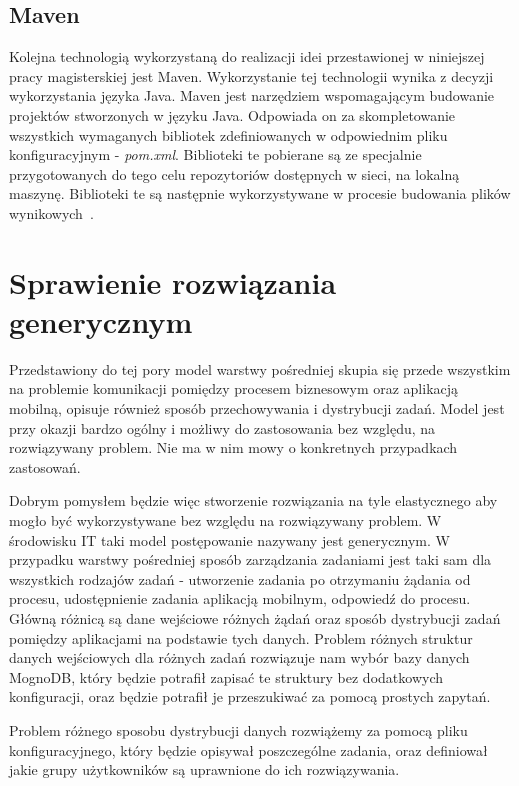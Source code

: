 \subsection{Maven}
Kolejna technologią wykorzystaną do realizacji idei przestawionej w niniejszej pracy magisterskiej jest Maven. Wykorzystanie tej technologii wynika z decyzji wykorzystania języka Java. Maven jest narzędziem wspomagającym budowanie projektów stworzonych w języku Java. Odpowiada on za skompletowanie wszystkich wymaganych bibliotek zdefiniowanych w odpowiednim pliku konfiguracyjnym - \textit{pom.xml}. Biblioteki te pobierane są ze specjalnie przygotowanych do tego celu repozytoriów dostępnych w sieci, na lokalną maszynę. Biblioteki te są następnie wykorzystywane w procesie budowania plików wynikowych~\cite{maven}.  


\section{Sprawienie rozwiązania generycznym}
\label{sec:generic}

Przedstawiony do tej pory model warstwy pośredniej skupia się przede wszystkim na problemie komunikacji pomiędzy procesem biznesowym oraz aplikacją mobilną, opisuje również sposób przechowywania i dystrybucji zadań. Model jest przy okazji bardzo ogólny i możliwy do zastosowania bez względu, na rozwiązywany problem. Nie ma w nim mowy o konkretnych przypadkach zastosowań. 

Dobrym pomysłem będzie więc stworzenie rozwiązania na tyle elastycznego aby mogło być wykorzystywane bez względu na rozwiązywany problem. W środowisku IT taki model postępowanie nazywany jest generycznym. W przypadku warstwy pośredniej sposób zarządzania zadaniami jest taki sam dla wszystkich rodzajów zadań - utworzenie zadania po otrzymaniu żądania od procesu, udostępnienie zadania aplikacją mobilnym, odpowiedź do procesu. Główną różnicą są dane wejściowe różnych żądań oraz sposób dystrybucji zadań pomiędzy aplikacjami na podstawie tych danych. Problem różnych struktur danych wejściowych dla różnych zadań rozwiązuje nam wybór bazy danych MognoDB, który będzie potrafił zapisać te struktury bez dodatkowych konfiguracji, oraz będzie potrafił je przeszukiwać za pomocą prostych zapytań. 

Problem różnego sposobu dystrybucji danych rozwiążemy za pomocą pliku konfiguracyjnego, który będzie opisywał poszczególne zadania, oraz definiował jakie grupy użytkowników są uprawnione do ich rozwiązywania.

